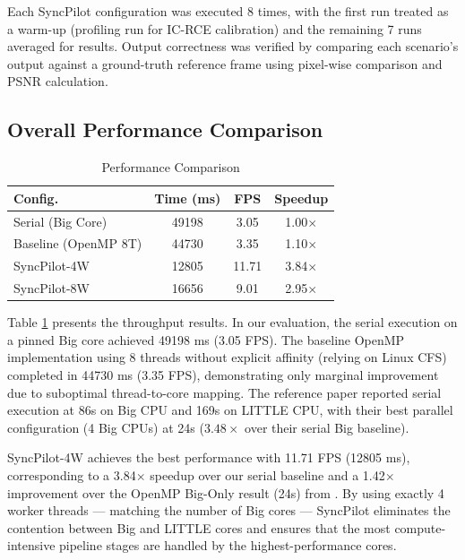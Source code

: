 \documentclass[conference]{IEEEtran}
\begin{document}
Each SyncPilot configuration was executed 8 times, with the first run treated as a warm-up (profiling run for IC-RCE calibration) and the remaining 7 runs averaged for results. Output correctness was verified by comparing each scenario's output against a ground-truth reference frame using pixel-wise comparison and PSNR calculation.

\subsection{Overall Performance Comparison}
\begin{table}[htbp]
\caption{Performance Comparison}
\begin{center}
\small
\begin{tabular}{|l|c|c|c|}
\hline
\textbf{Config.} & \textbf{Time (ms)} & \textbf{FPS} & \textbf{Speedup} \\
\hline
Serial (Big Core) & 49198 & 3.05 & 1.00$\times$ \\
Baseline (OpenMP 8T) & 44730 & 3.35 & 1.10$\times$ \\
SyncPilot-4W & 12805 & 11.71 & 3.84$\times$ \\
SyncPilot-8W & 16656 & 9.01 & 2.95$\times$ \\
\hline
\end{tabular}
\label{tab:throughput}
\end{center}
\end{table}

Table \ref{tab:throughput} presents the throughput results. In our evaluation, the serial execution on a pinned Big core achieved 49198 ms (3.05 FPS). The baseline OpenMP implementation using 8 threads without explicit affinity (relying on Linux CFS) completed in 44730 ms (3.35 FPS), demonstrating only marginal improvement due to suboptimal thread-to-core mapping. The reference paper \cite{annisa2025fsrcnn} reported serial execution at 86s on Big CPU and 169s on LITTLE CPU, with their best parallel configuration (4 Big CPUs) at 24s ($3.48\times$ over their serial Big baseline).

SyncPilot-4W achieves the best performance with 11.71 FPS (12805 ms), corresponding to a 3.84$\times$ speedup over our serial baseline and a 1.42$\times$ improvement over the OpenMP Big-Only result (24s) from \cite{annisa2025fsrcnn}. By using exactly 4 worker threads --- matching the number of Big cores --- SyncPilot eliminates the contention between Big and LITTLE cores and ensures that the most compute-intensive pipeline stages are handled by the highest-performance cores.
\end{document}

